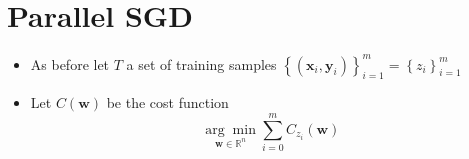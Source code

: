 \section{Parallel SGD}

\begin{itemize}
    \item As before let $T$ a set of training samples $\left\lbrace \left( \bm{x}_{i}, \bm{y}_i \right) \right\rbrace_{i=1}^{m} = \left\lbrace z_{i} \right\rbrace_{i=1}^{m}$
    \item Let $C \left( \bm{w} \right)$ be the cost function
    \[
        \underset{\bm{w} \in \mathbb{R}^{n}}{\arg \min } \sum_{i=0}^{m} C_{z_{i}}\left( \bm{w} \right)
    \]
\end{itemize}